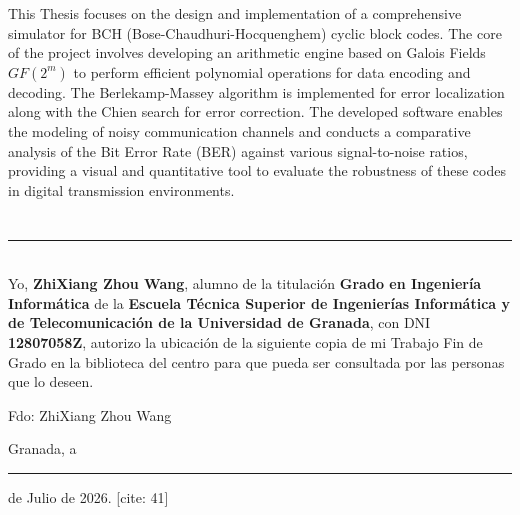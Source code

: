 This Thesis focuses on the design and implementation of a comprehensive simulator for BCH (Bose-Chaudhuri-Hocquenghem) cyclic block codes. The core of the project involves developing an arithmetic engine based on Galois Fields $GF(2^m)$ to perform efficient polynomial operations for data encoding and decoding. The Berlekamp-Massey algorithm is implemented for error localization along with the Chien search for error correction. The developed software enables the modeling of noisy communication channels and conducts a comparative analysis of the Bit Error Rate (BER) against various signal-to-noise ratios, providing a visual and quantitative tool to evaluate the robustness of these codes in digital transmission environments.

\cleardoublepage


\chapter*{}
\thispagestyle{empty}

\noindent\rule[-1ex]{\textwidth}{2pt}\\[4.5ex]

Yo, \textbf{ZhiXiang Zhou Wang}, alumno de la titulación \textbf{Grado en Ingeniería Informática} de la \textbf{Escuela Técnica Superior de Ingenierías Informática y de Telecomunicación de la Universidad de Granada}, con DNI \textbf{12807058Z}, autorizo la ubicación de la siguiente copia de mi Trabajo Fin de Grado en la biblioteca del centro para que pueda ser consultada por las personas que lo deseen. 

\vspace{5cm}

\noindent Fdo: ZhiXiang Zhou Wang

\vspace{2cm}

\begin{flushright}
    Granada, a \rule{1cm}{0.4pt} de Julio de 2026. [cite: 41]
\end{flushright}

\cleardoublepage


\chapter*{}
\thispagestyle{empty}


